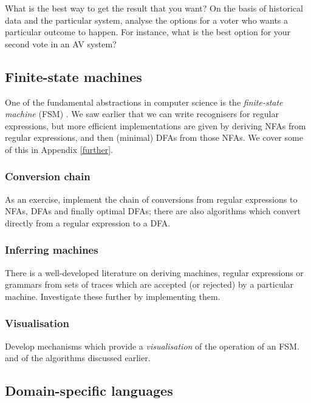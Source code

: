 What is the best way to get the result that you want? On the basis of historical data and the particular system, analyse the options for a voter who wants a particular outcome to happen. For instance, what is the best option for your second vote in an AV system?

\subsection*{Finite-state machines}

One of the fundamental abstractions in computer science is the \emph{finite-state machine} (FSM) \cite{dragon2ed}. We saw earlier that we can write recognisers for regular expressions, but more efficient implementations are given by deriving NFAs from regular expressions, and then (minimal) DFAs from those NFAs. We cover some of this in Appendix \ref{further}.

\subsubsection*{Conversion chain}

As an exercise, implement the chain of conversions from regular expressions to NFAs, DFAs and finally optimal DFAs; there are also algorithms which convert directly from a regular expression to a DFA.

\subsubsection*{Inferring machines}

There is a well-developed literature on deriving machines, regular expressions or grammars from sets of traces which are accepted (or rejected) by a particular machine. Investigate these further by implementing them. 

\subsubsection*{Visualisation}

Develop mechanisms which provide a \emph{visualisation} of the operation of an FSM. and of the algorithms discussed earlier.

\subsection*{Domain-specific languages}

